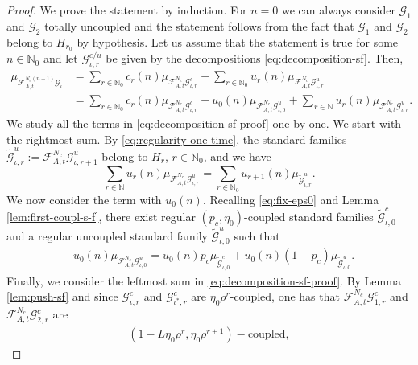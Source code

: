 \documentclass{amsart}
\numberwithin{equation}{section}
\newcommand\cF{{\mathcal F}}
\newcommand\cG{{\mathcal G}}
\newcommand\bN{{\mathbb N}}
\newcommand{\catt}{\cF_{A,t}}
\begin{document}
\begin{proof}
We prove the statement by induction. For \(n = 0\) we can always consider \(\cG_1\) and \(\cG_2\) totally uncoupled and the statement follows from the fact that \(\cG_1\) and \(\cG_2\) belong to \(H_{r_0}\) by hypothesis. Let us assume that the statement is true for some \(n \in \bN_0\) and let \(\cG_{\iota,r}^{c/u}\) be given by the decompositions \eqref{eq:decomposition-sf}. Then,
\begin{equation}\label{eq:decomposition-sf-proof}
\begin{split}
   \mu_{\catt^{N_c (n+1)}\cG_\iota} &= \sum_{r \in \bN_0} c_r(n) \mu_{\catt^{N_c}\cG_{\iota,r}^c} + \sum_{r \in \bN_0}u_r(n)\mu_{\catt^{N_c}\cG_{\iota,r}^u}\\
&=\sum_{r \in \bN_0} c_r(n) \mu_{\catt^{N_c}\cG_{\iota,r}^c} + u_0(n)\mu_{\catt^{N_c}\cG_{\iota,0}^u} + \sum_{r \in \bN}u_r(n)\mu_{\catt^{N_c}\cG_{\iota,r}^u}.
\end{split}
\end{equation}
We study all the terms in \eqref{eq:decomposition-sf-proof} one by one. We start with the rightmost sum. By \eqref{eq:regularity-one-time}, the standard families \(\widetilde \cG_{\iota,r}^u := \catt^{N_c}\cG_{\iota,r+1}^u\) belong to \(H_r\), \(r \in \bN_0\), and we have
\begin{equation}\label{eq:matrix-u-u}
\sum_{r \in \bN}u_r(n)\mu_{\catt^{N_c}\cG_{\iota,r}^u} = \sum_{r \in \bN_0}u_{r+1}(n)\mu_{\widetilde \cG_{\iota,r}^u}.
\end{equation}
We now consider the term with \(u_0(n)\). Recalling \eqref{eq:fix-eps0} and Lemma \ref{lem:first-coupl-s-f}, there exist regular \((p_c, \eta_0)\)-coupled standard families \(\widetilde \cG_{\iota,0}^c\) and a regular uncoupled standard family \(\widetilde \cG_{\iota,0}^u\) such that
\begin{equation}\label{eq:matrix-u-c}
\begin{split}
&u_0(n)\mu_{\catt^{N_c}\cG_{\iota,0}^u} =  u_0(n)p_c\mu_{\widetilde \cG_{\iota,0}^c} + u_0(n)(1-p_c)\mu_{\widetilde \cG_{\iota,0}^u}.
\end{split}
\end{equation}
Finally, we consider the leftmost sum in \eqref{eq:decomposition-sf-proof}. By Lemma \ref{lem:push-sf} and since \(\cG_{\iota, r}^c\) and \(\cG_{\iota^*,r}^c\) are \(\eta_0 \rho^{r}\)-coupled, one has that \(\catt^{N_c}\cG_{1,r}^c\) and \(\catt^{N_c}\cG_{2,r}^c\) are 
\[
\begin{split}
   (1 -L\eta_0 \rho^r, \eta_0 \rho^{r+1})-\text{coupled},

\end{split}\]
\end{proof}
\end{document}
